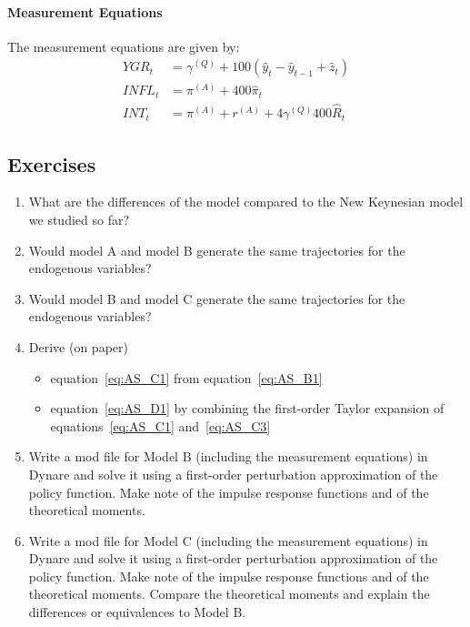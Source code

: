 \paragraph{Measurement Equations}
The measurement equations are given by:
\begin{align}
{YGR}_t &= \gamma^{(Q)} + 100(\hat{y}_t-\hat{y}_{t-1} + \hat{z}_t)
\\
{INFL}_t &= \pi^{(A)} + 400 \hat{\pi}_t
\\
{INT}_t &= \pi^{(A)} + r^{(A)} + 4 \gamma^{(Q)} 400 \hat{R}_t
\end{align}

\subsection*{Exercises}
\begin{enumerate}
\item What are the differences of the model compared to the New Keynesian model we studied so far?

\item Would model A and model B generate the same trajectories for the endogenous variables?
  
\item Would model B and model C generate the same trajectories for the endogenous variables?
  
\item Derive (on paper)
\begin{itemize}
    \item equation~\eqref{eq:AS_C1} from equation~\eqref{eq:AS_B1}
    \item equation~\eqref{eq:AS_D1} by combining the first-order Taylor expansion of equations~\eqref{eq:AS_C1} and~\eqref{eq:AS_C3}
\end{itemize}

\item Write a mod file for Model B (including the measurement equations) in Dynare
  and solve it using a first-order perturbation approximation of the policy function.
Make note of the impulse response functions and of the theoretical moments.

\item Write a mod file for Model C (including the measurement equations) in Dynare
  and solve it using a first-order perturbation approximation of the policy function.
Make note of the impulse response functions and of the theoretical moments.
Compare the theoretical moments and explain the differences or equivalences to Model B.
  

\end{enumerate}
